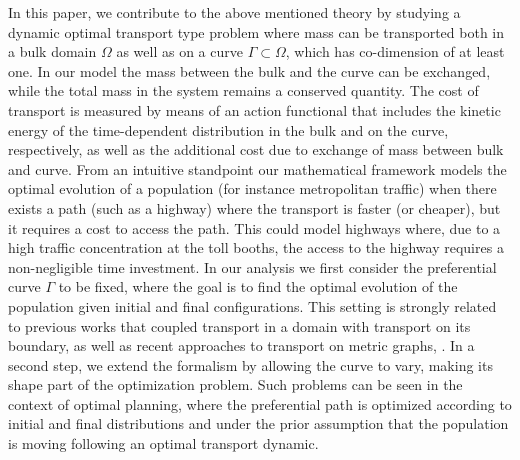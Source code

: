 \documentclass{article}
\begin{document}
In this paper, we contribute to the above mentioned theory by studying a dynamic optimal transport type problem where mass can be transported both in a bulk domain $\Omega$ as well as on a curve $\Gamma \subset \Omega$, which has co-dimension of at least one. 
In our model the mass between the bulk and the curve can be exchanged, while the total mass in the system remains a conserved quantity. 
The cost of transport is measured by means of an action functional that includes the kinetic energy of the time-dependent distribution in the bulk and on the curve, respectively, as well as the additional cost due to exchange of mass between bulk and curve. From an intuitive standpoint our mathematical framework models the optimal evolution of a population (for instance metropolitan traffic) when there exists a path (such as a highway) where the transport is faster (or cheaper), but it requires a cost to access the path. This could model highways where, due to a high traffic concentration at the toll booths, the access to the highway requires a non-negligible time investment. 
In our analysis we first consider the preferential curve $\Gamma$ to be fixed, where the goal is to find the optimal evolution of the population given initial and final configurations. This setting is strongly related to previous works that coupled transport in a domain with transport on its boundary, \cite{monsaingeon2021new} as well as recent approaches to transport on metric graphs, \cite{Erbar2022,BurgerHumpertPietschmann2023}.
In a second step, we extend the formalism by allowing the curve to vary, making its shape part of the optimization problem. Such problems can be seen in the context of optimal planning, where the preferential path is optimized according to initial and final distributions and under the prior assumption that the population is moving following an optimal transport dynamic.
\end{document}
